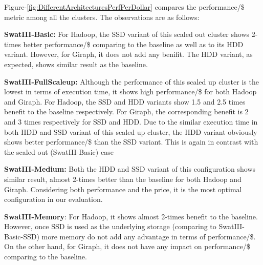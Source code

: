 \documentclass[conference]{IEEEtran}
\begin{document}
Figure-\ref{fig:DifferentArchitecturesPerfPerDollar} compares the performance/\$ metric among all the clusters.
The observations are as follows:
\begin{inparaenum}[\itshape 1\upshape)]
\item \textbf{SwatIII-Basic:} For Hadoop, the SSD variant of this scaled out cluster shows 2-times better performance/\$ comparing to the baseline as well as to its HDD variant. However, for Giraph, it does not add any benifit. The HDD variant, as expected, shows similar result as the baseline.
\item \textbf{SwatIII-FullScaleup:} Although the performance of this scaled up cluster is the lowest in terms of execution time, it shows high performance/\$ for both Hadoop and Giraph. For Hadoop, the SSD and HDD variants show 1.5 and 2.5 times benefit to the baseline respectively. For Giraph, the corresponding benefit is 2 and 3 times respectively for SSD and HDD. Due to the similar execution time in both HDD and SSD variant of this scaled up cluster, the HDD variant obviously shows better performance/\$ than the SSD variant. This is again in contrast with the scaled out (SwatIII-Basic) case
\item \textbf{SwatIII-Medium:} Both the HDD and SSD variant of this configuration shows similar result, almost 2-times better than the baseline for both Hadoop and Giraph. Considering both performance and the price, it is the most optimal configuration in our evaluation.
\item \textbf{SwatIII-Memory}: For Hadoop, it shows almost 2-times benefit to the baseline. However, once SSD is used as the underlying storage (comparing to SwatIII-Basic-SSD) more memory do not add any advantage in terms of performance/\$. On the other hand, for Giraph, it does not have any impact on performance/\$ comparing to the baseline. %
\end{inparaenum}
\end{document}
